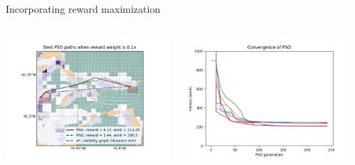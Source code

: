\documentclass[9pt,xcolor=table]{beamer}
\begin{document}
\begin{frame}{Incorporating reward maximization}
    \begin{columns}
        \begin{column}{0.33\textwidth}
            \includegraphics[width=1.2\textwidth,trim={3cm 0cm 0cm 0cm},clip]{img/paths_FP1_RW0.1.png}
        \end{column}
        \begin{column}{0.31\textwidth}
            \includegraphics[width=1.2\textwidth,trim={0cm 0cm 2.5cm 0cm},clip]{img/FP1_RW0.1_convergence.png}
        \end{column}
        \begin{column}{0.37\textwidth}

\end{column}
\end{columns}
\end{frame}
\end{document}
